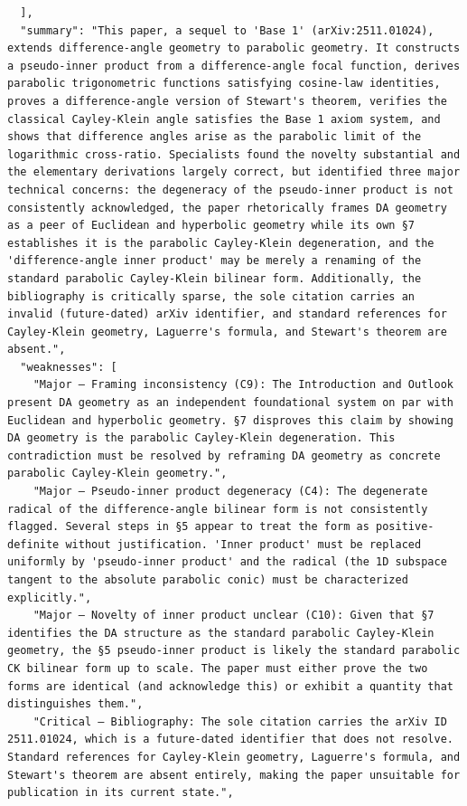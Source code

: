 \documentclass[11pt]{article}
\begin{document}
\begin{verbatim}
  ],
  "summary": "This paper, a sequel to 'Base 1' (arXiv:2511.01024), extends difference-angle geometry to parabolic geometry. It constructs a pseudo-inner product from a difference-angle focal function, derives parabolic trigonometric functions satisfying cosine-law identities, proves a difference-angle version of Stewart's theorem, verifies the classical Cayley-Klein angle satisfies the Base 1 axiom system, and shows that difference angles arise as the parabolic limit of the logarithmic cross-ratio. Specialists found the novelty substantial and the elementary derivations largely correct, but identified three major technical concerns: the degeneracy of the pseudo-inner product is not consistently acknowledged, the paper rhetorically frames DA geometry as a peer of Euclidean and hyperbolic geometry while its own §7 establishes it is the parabolic Cayley-Klein degeneration, and the 'difference-angle inner product' may be merely a renaming of the standard parabolic Cayley-Klein bilinear form. Additionally, the bibliography is critically sparse, the sole citation carries an invalid (future-dated) arXiv identifier, and standard references for Cayley-Klein geometry, Laguerre's formula, and Stewart's theorem are absent.",
  "weaknesses": [
    "Major — Framing inconsistency (C9): The Introduction and Outlook present DA geometry as an independent foundational system on par with Euclidean and hyperbolic geometry. §7 disproves this claim by showing DA geometry is the parabolic Cayley-Klein degeneration. This contradiction must be resolved by reframing DA geometry as concrete parabolic Cayley-Klein geometry.",
    "Major — Pseudo-inner product degeneracy (C4): The degenerate radical of the difference-angle bilinear form is not consistently flagged. Several steps in §5 appear to treat the form as positive-definite without justification. 'Inner product' must be replaced uniformly by 'pseudo-inner product' and the radical (the 1D subspace tangent to the absolute parabolic conic) must be characterized explicitly.",
    "Major — Novelty of inner product unclear (C10): Given that §7 identifies the DA structure as the standard parabolic Cayley-Klein geometry, the §5 pseudo-inner product is likely the standard parabolic CK bilinear form up to scale. The paper must either prove the two forms are identical (and acknowledge this) or exhibit a quantity that distinguishes them.",
    "Critical — Bibliography: The sole citation carries the arXiv ID 2511.01024, which is a future-dated identifier that does not resolve. Standard references for Cayley-Klein geometry, Laguerre's formula, and Stewart's theorem are absent entirely, making the paper unsuitable for publication in its current state.",

\end{verbatim}
\end{document}
